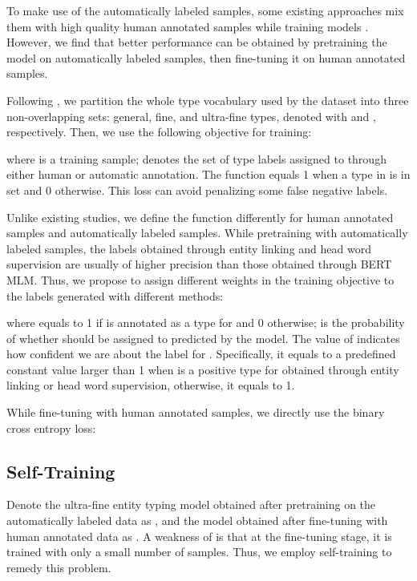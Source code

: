 \documentclass[11pt,a4paper]{article}
\begin{document}
To make use of the automatically labeled samples, some existing approaches mix them with high quality human annotated samples while training models \cite{choi2018ultra,onoe2019learning}. However, we find that better performance can be obtained by pretraining the model on automatically labeled samples, then fine-tuning it on human annotated samples.


Following \cite{choi2018ultra}, we partition the whole type vocabulary used by the dataset into three non-overlapping sets: general, fine, and ultra-fine types, denoted with  and , respectively. Then, we use the following objective for training:

where  is a training sample;  denotes the set of type labels assigned to  through either human or automatic annotation. The function  equals 1 when a type in  is in set  and 0 otherwise. This loss can avoid penalizing some false negative labels.

Unlike existing studies, we define the function  differently for human annotated samples and automatically labeled samples.
While pretraining with automatically labeled samples, the labels obtained through entity linking and head word supervision are usually of higher precision than those obtained through BERT MLM. Thus, we propose to assign different weights in the training objective to the labels generated with different methods:

where  equals to 1 if  is annotated as a type for  and 0 otherwise;  is the probability of whether  should be assigned to  predicted by the model.
The value of  indicates how confident we are about the label  for . Specifically, it equals to a predefined constant value larger than 1 when  is a positive type for  obtained through entity linking or head word supervision, otherwise, it equals to 1.

While fine-tuning with human annotated samples, we directly use the binary cross entropy loss:





\subsection{Self-Training}
\label{sec:self-train}





Denote the ultra-fine entity typing model obtained after pretraining on the automatically labeled data as , and the model obtained after fine-tuning  with human annotated data as . A weakness of  is that at the fine-tuning stage, it is trained with only a small number of samples. Thus, we employ self-training to remedy this problem.
\end{document}
